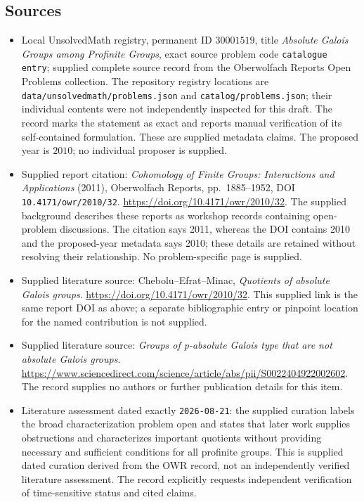 \documentclass[11pt]{article}
\begin{document}
\subsection{Sources}
\begin{itemize}
\item Local UnsolvedMath registry, permanent ID \(30001519\), title \emph{Absolute Galois Groups among Profinite Groups}, exact source problem code \texttt{catalogue entry}; supplied complete source record from the Oberwolfach Reports Open Problems collection. The repository registry locations are \texttt{data/unsolvedmath/problems.json} and \texttt{catalog/problems.json}; their individual contents were not independently inspected for this draft. The record marks the statement as exact and reports manual verification of its self-contained formulation. These are supplied metadata claims. The proposed year is \(2010\); no individual proposer is supplied.
\item Supplied report citation: \emph{Cohomology of Finite Groups: Interactions and Applications} (2011), Oberwolfach Reports, pp.\ 1885--1952, DOI \texttt{10.4171/owr/2010/32}. \url{https://doi.org/10.4171/owr/2010/32}. The supplied background describes these reports as workshop records containing open-problem discussions. The citation says 2011, whereas the DOI contains 2010 and the proposed-year metadata says 2010; these details are retained without resolving their relationship. No problem-specific page is supplied.
\item Supplied literature source: Chebolu--Efrat--Minac, \emph{Quotients of absolute Galois groups}. \url{https://doi.org/10.4171/owr/2010/32}. This supplied link is the same report DOI as above; a separate bibliographic entry or pinpoint location for the named contribution is not supplied.
\item Supplied literature source: \emph{Groups of p-absolute Galois type that are not absolute Galois groups}. \url{https://www.sciencedirect.com/science/article/abs/pii/S0022404922002602}. The record supplies no authors or further publication details for this item.
\item Literature assessment dated exactly \texttt{2026-08-21}: the supplied curation labels the broad characterization problem open and states that later work supplies obstructions and characterizes important quotients without providing necessary and sufficient conditions for all profinite groups. This is supplied dated curation derived from the OWR record, not an independently verified literature assessment. The record explicitly requests independent verification of time-sensitive status and cited claims.
\end{itemize}
\end{document}
